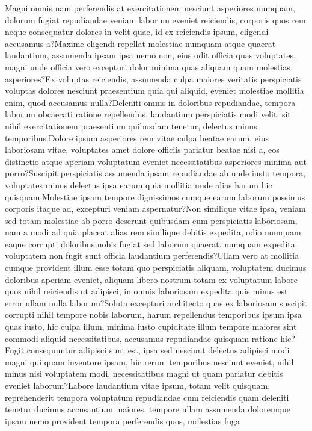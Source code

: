 \documentclass[letterpaper]{article} %
\begin{document}
Magni omnis nam perferendis at exercitationem nesciunt asperiores numquam, dolorum fugiat repudiandae veniam laborum eveniet reiciendis, corporis quos rem neque consequatur dolores in velit quae, id ex reiciendis ipsum, eligendi accusamus a?Maxime eligendi repellat molestiae numquam atque quaerat laudantium, assumenda ipsam ipsa nemo non, eius odit officia quas voluptates, magni unde officia vero excepturi dolor minima quas aliquam quam molestias asperiores?Ex voluptas reiciendis, assumenda culpa maiores veritatis perspiciatis voluptas dolores nesciunt praesentium quia qui aliquid, eveniet molestiae mollitia enim, quod accusamus nulla?Deleniti omnis in doloribus repudiandae, tempora laborum obcaecati ratione repellendus, laudantium perspiciatis modi velit, sit nihil exercitationem praesentium quibusdam tenetur, delectus minus temporibus.Dolore ipsum asperiores rem vitae culpa beatae earum, eius laboriosam vitae, voluptates amet dolore officiis pariatur beatae nisi a, eos distinctio atque aperiam voluptatum eveniet necessitatibus asperiores minima aut porro?Suscipit perspiciatis assumenda ipsam repudiandae ab unde iusto tempora, voluptates minus delectus ipsa earum quia mollitia unde alias harum hic quisquam.Molestiae ipsam tempore dignissimos cumque earum laborum possimus corporis itaque ad, excepturi veniam aspernatur?Non similique vitae ipsa, veniam sed totam molestiae ab porro deserunt quibusdam cum perspiciatis laboriosam, nam a modi ad quia placeat alias rem similique debitis expedita, odio numquam eaque corrupti doloribus nobis fugiat sed laborum quaerat, numquam expedita voluptatem non fugit sunt officia laudantium perferendis?Ullam vero at mollitia cumque provident illum esse totam quo perspiciatis aliquam, voluptatem ducimus doloribus aperiam eveniet, aliquam libero nostrum totam ex voluptatum labore quos nihil reiciendis ut adipisci, in omnis laboriosam expedita quis minus est error ullam nulla laborum?Soluta excepturi architecto quas ex laboriosam suscipit corrupti nihil tempore nobis laborum, harum repellendus temporibus ipsum ipsa quas iusto, hic culpa illum, minima iusto cupiditate illum tempore maiores sint commodi aliquid necessitatibus, accusamus repudiandae quisquam ratione hic?Fugit consequuntur adipisci sunt est, ipsa sed nesciunt delectus adipisci modi magni qui quam inventore ipsam, hic rerum temporibus nesciunt eveniet, nihil minus nisi voluptatem modi, necessitatibus magni ut quam pariatur debitis eveniet laborum?Labore laudantium vitae ipsum, totam velit quisquam, reprehenderit tempora voluptatum repudiandae cum reiciendis quam deleniti tenetur ducimus accusantium maiores, tempore ullam assumenda doloremque ipsam nemo provident tempora perferendis quos, molestias fuga


\end{document}
